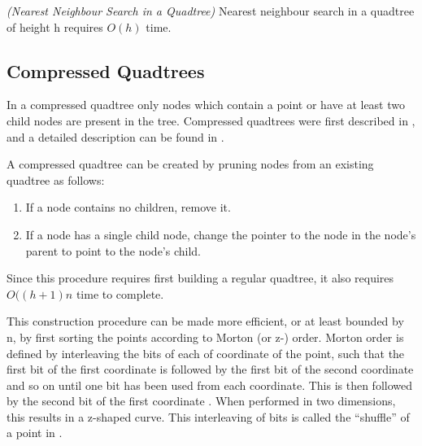 \documentclass[mcs]{scsthesis}
\begin{document}
\begin{thm} \emph{(Nearest Neighbour Search in a Quadtree)} 
Nearest neighbour search in a quadtree of height h requires \(O(h)\) time.
\end{thm}

\subsection{Compressed Quadtrees}

In a compressed quadtree only nodes which contain a point or have at least two
child nodes are present in the tree. Compressed quadtrees were first described
in \cite{compressedquadtree}, and a detailed description can be found in
\cite{skipquadtree}.

A compressed quadtree can be created by pruning nodes from an existing quadtree
as follows:

\begin{enumerate}
\item If a node contains no children, remove it.
\item If a node has a single child node, change the pointer to the node in the
node's parent to point to the node's child.
\end{enumerate}

Since this procedure requires first building a regular quadtree, it also
requires \(O((h + 1)n\) time to complete.

This construction procedure can be made more efficient, or at least bounded by
n, by first sorting the points according to Morton (or z-) order. Morton order
is defined by interleaving the bits of each of coordinate of the point, such
that the first bit of the first coordinate is followed by the first bit of the
second coordinate and so on until one bit has been used from each coordinate.
This is then followed by the second bit of the first coordinate \cite{morton}.
When performed in two dimensions, this results in a z-shaped curve. This
interleaving of bits is called the ``shuffle'' of a point in \cite{bern}.
\end{document}
